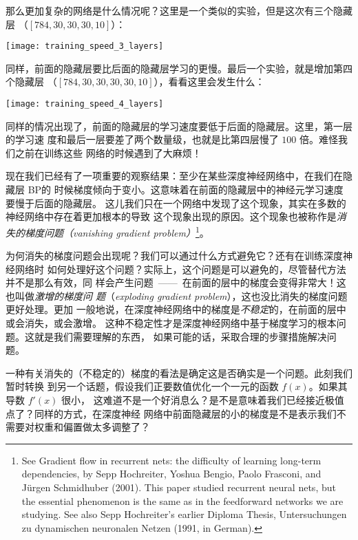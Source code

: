 那么更加复杂的网络是什么情况呢？这里是一个类似的实验，但是这次有三个隐藏层
（$[784, 30, 30, 30, 10]$）：
\begin{center}
  \texttt{[image: training\_speed\_3\_layers]}
\end{center}
 
同样，前面的隐藏层要比后面的隐藏层学习的更慢。最后一个实验，就是增加第四个隐藏层
（$[784, 30, 30, 30, 30, 10]$），看看这里会发生什么：
\begin{center}
  \texttt{[image: training\_speed\_4\_layers]}
\end{center}
 
同样的情况出现了，前面的隐藏层的学习速度要低于后面的隐藏层。这里，第一层的学习速
度和最后一层要差了两个数量级，也就是比第四层慢了 $100$ 倍。难怪我们之前在训练这些
网络的时候遇到了大麻烦！
 
现在我们已经有了一项重要的观察结果：至少在某些深度神经网络中，在我们在隐藏层 BP的
时候梯度倾向于变小。这意味着在前面的隐藏层中的神经元学习速度要慢于后面的隐藏层。
这儿我们只在一个网络中发现了这个现象，其实在多数的神经网络中存在着更加根本的导致
这个现象出现的原因。这个现象也被称作是\emph{消失的梯度问题（vanishing gradient problem）}\footnote{See Gradient flow in recurrent
  nets: the difficulty of learning long-term dependencies, by Sepp Hochreiter,
  Yoshua Bengio, Paolo Frasconi, and Jürgen Schmidhuber (2001). This paper
  studied recurrent neural nets, but the essential phenomenon is the same as in
  the feedforward networks we are studying. See also Sepp Hochreiter's earlier
  Diploma Thesis, Untersuchungen zu dynamischen neuronalen Netzen (1991, in
  German).}。
 
为何消失的梯度问题会出现呢？我们可以通过什么方式避免它？还有在训练深度神经网络时
如何处理好这个问题？实际上，这个问题是可以避免的，尽管替代方法并不是那么有效，同
样会产生问题~——~在前面的层中的梯度会变得非常大！这也叫做\emph{激增的梯度问
  题}（\emph{exploding gradient problem}），这也没比消失的梯度问题更好处理。更加
一般地说，在深度神经网络中的梯度是\emph{不稳定}的，在前面的层中或会消失，或会激增。
这种不稳定性才是深度神经网络中基于梯度学习的根本问题。这就是我们需要理解的东西，
如果可能的话，采取合理的步骤措施解决问题。
 
一种有关消失的（不稳定的）梯度的看法是确定这是否确实是一个问题。此刻我们暂时转换
到另一个话题，假设我们正要数值优化一个一元的函数 $f(x)$。如果其导数 $f'(x)$ 很小，
这难道不是一个好消息么？是不是意味着我们已经接近极值点了？同样的方式，在深度神经
网络中前面隐藏层的小的梯度是不是表示我们不需要对权重和偏置做太多调整了？
 

